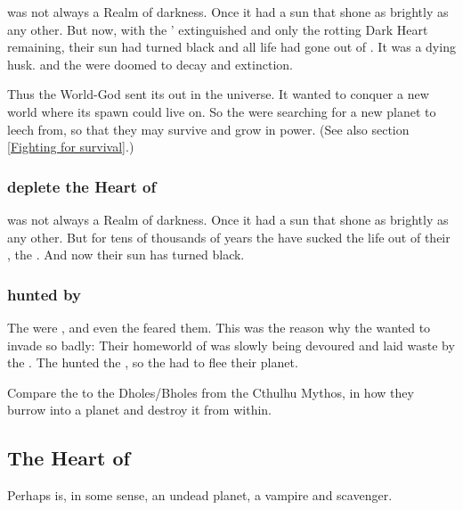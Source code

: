 \Erebos{} was not always a Realm of darkness. 
Once it had a sun that shone as brightly as any other. 
But now, with the \voyagers' \dweomer extinguished and only the rotting Dark Heart remaining, their sun had turned black and all life had gone out of \Erebos.
It was a dying husk.
\Erebos{} and the \banes{} were doomed to decay and extinction. 

Thus the World-God sent its \banes out in the universe.
It wanted to conquer a new world where its spawn could live on.
So the \banes{} were searching for a new planet to leech from, so that they may survive and grow in power. 
(See also section \ref{Fighting for survival}.)





\subsubsection{\Banes deplete the Heart of \Erebos}
\Erebos{} was not always a Realm of darkness. 
Once it had a sun that shone as brightly as any other. 
But for tens of thousands of years the \banes{} have sucked the life out of their , the . 
And now their sun has turned black. 





\subsubsection{\Banes hunted by \umbrae}
The \umbrae were , and even the \banes feared them. 
This was the reason why the \banes wanted to invade \Miith so badly:
Their homeworld of \Erebos was slowly being devoured and laid waste by the \umbrae.
The \umbrae hunted the \banes, so the \banes had to flee their planet. 

Compare the \umbrae to the Dholes/Bholes from the Cthulhu Mythos, in how they burrow into a planet and destroy it from within.









\subsection{The Heart of \Erebos}
Perhaps \Erebos{} is, in some sense, an undead planet, a vampire and scavenger.

